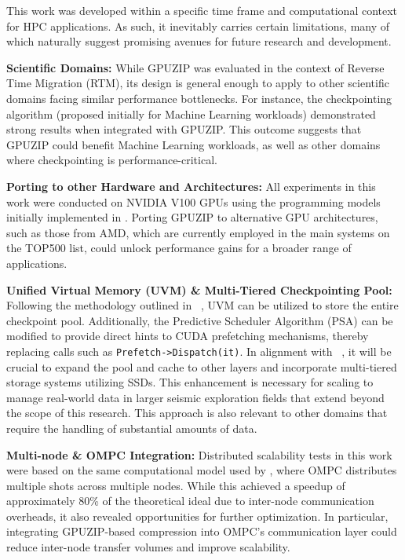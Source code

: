 \documentclass[Ingles,Final]{ic-tese-v3}
\begin{document}
This work was developed within a specific time frame and computational context for HPC applications. As such, it inevitably carries certain limitations, many of which naturally suggest promising avenues for future research and development.

\textbf{Scientific Domains:} While GPUZIP was evaluated in the context of Reverse Time Migration (RTM), its design is general enough to apply to other scientific domains facing similar performance bottlenecks. For instance, the \zcut checkpointing algorithm (proposed initially for Machine Learning workloads) demonstrated strong results when integrated with GPUZIP. This outcome suggests that GPUZIP could benefit Machine Learning workloads, as well as other domains where checkpointing is performance-critical.

\textbf{Porting to other Hardware and Architectures:} All experiments in this work were conducted on NVIDIA V100 GPUs using the programming models initially implemented in \awave. Porting GPUZIP to alternative GPU architectures, such as those from AMD, which are currently employed in the main systems on the TOP500 list, could unlock performance gains for a broader range of applications. 

\textbf{Unified Virtual Memory (UVM) \& Multi-Tiered Checkpointing Pool:} Following the methodology outlined in ~\cite{rigon2024}, UVM can be utilized to store the entire checkpoint pool. Additionally, the Predictive Scheduler Algorithm (PSA) can be modified to provide direct hints to CUDA prefetching mechanisms, thereby replacing calls such as \texttt{Prefetch->Dispatch(it)}. In alignment with ~\cite{maurya2023}, it will be crucial to expand the pool and cache to other layers and incorporate multi-tiered storage systems utilizing SSDs. This enhancement is necessary for scaling to manage real-world data in larger seismic exploration fields that extend beyond the scope of this research. This approach is also relevant to other domains that require the handling of substantial amounts of data.

\textbf{Multi-node \& OMPC Integration:} Distributed scalability tests in this work were based on the same computational model used by \awave, where OMPC distributes multiple shots across multiple nodes. While this achieved a speedup of approximately 80\% of the theoretical ideal due to inter-node communication overheads, it also revealed opportunities for further optimization. In particular, integrating GPUZIP-based compression into OMPC’s communication layer could reduce inter-node transfer volumes and improve scalability.
\end{document}

